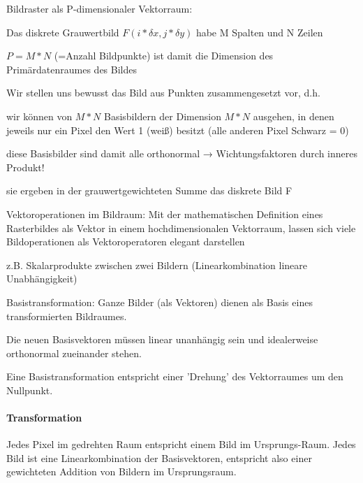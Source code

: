 \documentclass[landscape]{article}
\begin{document}
\begin{multicols}{3}
  Bildraster als P-dimensionaler Vektorraum:
  \begin{itemize*}
    \item Das diskrete Grauwertbild $F (i* \delta x, j * \delta y )$ habe M Spalten und N Zeilen
    \item $P = M * N$ (=Anzahl Bildpunkte) ist damit die Dimension des Primärdatenraumes des Bildes
    \item Wir stellen uns bewusst das Bild aus Punkten zusammengesetzt vor, d.h.
    \begin{itemize*}
      \item wir können von $M * N$ Basisbildern der Dimension $M * N$ ausgehen, in denen jeweils nur ein Pixel den Wert 1 (weiß) besitzt (alle anderen Pixel Schwarz = 0)
      \item diese Basisbilder sind damit alle orthonormal → Wichtungsfaktoren durch inneres Produkt!
      \item sie ergeben in der grauwertgewichteten Summe das diskrete Bild F
    \end{itemize*}
  \end{itemize*}
  
  
  Vektoroperationen im Bildraum: Mit der mathematischen Definition eines Rasterbildes als Vektor in einem hochdimensionalen Vektorraum, lassen sich viele Bildoperationen als Vektoroperatoren elegant darstellen
  \begin{itemize*}
    \item z.B. Skalarprodukte zwischen zwei Bildern (Linearkombination lineare Unabhängigkeit)
    \item Basistransformation: Ganze Bilder (als Vektoren) dienen als Basis eines transformierten Bildraumes.
    \item Die neuen Basisvektoren müssen linear unanhängig sein und idealerweise orthonormal zueinander stehen.
    \item Eine Basistransformation entspricht einer 'Drehung' des Vektorraumes um den Nullpunkt.
  \end{itemize*}
  
  \paragraph{Transformation}
  Jedes Pixel im gedrehten Raum entspricht einem Bild im Ursprungs-Raum.
  Jedes Bild ist eine Linearkombination der Basisvektoren, entspricht also einer gewichteten Addition von Bildern im Ursprungsraum.
  

\end{multicols}
\end{document}

